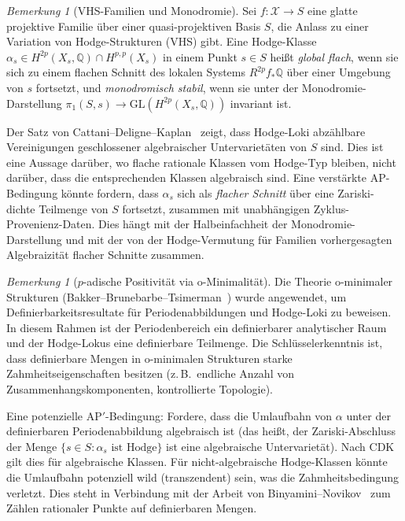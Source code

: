 \documentclass[aps,prd,twocolumn,superscriptaddress,nofootinbib]{revtex4-2}
\theoremstyle{definition}
\theoremstyle{remark}
\newtheorem{remark}[theorem]{Bemerkung}
\begin{document}
\begin{remark}[VHS-Familien und Monodromie]
\label{rem:vhs-monodromy}
Sei $f: \mathcal{X} \to S$ eine glatte projektive Familie über einer quasi-projektiven Basis $S$, die Anlass zu einer Variation von Hodge-Strukturen (VHS) gibt. Eine Hodge-Klasse $\alpha_s \in H^{2p}(X_s, \mathbb{Q}) \cap H^{p,p}(X_s)$ in einem Punkt $s \in S$ heißt \textit{global flach}, wenn sie sich zu einem flachen Schnitt des lokalen Systems $R^{2p}f_*\mathbb{Q}$ über einer Umgebung von $s$ fortsetzt, und \textit{monodromisch stabil}, wenn sie unter der Monodromie-Darstellung $\pi_1(S, s) \to \mathrm{GL}(H^{2p}(X_s, \mathbb{Q}))$ invariant ist.

Der Satz von Cattani--Deligne--Kaplan~\cite{CattaniDeligneKaplan1995} zeigt, dass Hodge-Loki abzählbare Vereinigungen geschlossener algebraischer Untervarietäten von $S$ sind. Dies ist eine Aussage darüber, wo flache rationale Klassen vom Hodge-Typ bleiben, nicht darüber, dass die entsprechenden Klassen algebraisch sind. Eine verstärkte AP-Bedingung könnte fordern, dass $\alpha_s$ sich als \textit{flacher Schnitt} über eine Zariski-dichte Teilmenge von $S$ fortsetzt, zusammen mit unabhängigen Zyklus-Provenienz-Daten. Dies hängt mit der Halbeinfachheit der Monodromie-Darstellung und mit der von der Hodge-Vermutung für Familien vorhergesagten Algebraizität flacher Schnitte zusammen.
\end{remark}

\begin{remark}[$p$-adische Positivität via o-Minimalität]
\label{rem:o-minimality}
Die Theorie o-minimaler Strukturen (Bakker--Brunebarbe--Tsimerman~\cite{BBT2023}) wurde angewendet, um Definierbarkeitsresultate für Periodenabbildungen und Hodge-Loki zu beweisen. In diesem Rahmen ist der Periodenbereich ein definierbarer analytischer Raum und der Hodge-Lokus eine definierbare Teilmenge. Die Schlüsselerkenntnis ist, dass definierbare Mengen in o-minimalen Strukturen starke Zahmheitseigenschaften besitzen (z.\,B.\ endliche Anzahl von Zusammenhangskomponenten, kontrollierte Topologie).

Eine potenzielle AP$'$-Bedingung: Fordere, dass die \glqq Umlaufbahn\grqq{} von $\alpha$ unter der definierbaren Periodenabbildung algebraisch ist (das heißt, der Zariski-Abschluss der Menge $\{s \in S : \alpha_s \text{ ist Hodge}\}$ ist eine algebraische Untervarietät). Nach CDK gilt dies für algebraische Klassen. Für nicht-algebraische Hodge-Klassen könnte die Umlaufbahn potenziell \glqq wild\grqq{} (transzendent) sein, was die Zahmheitsbedingung verletzt. Dies steht in Verbindung mit der Arbeit von Binyamini--Novikov~\cite{BinyaminiNovikov2017} zum Zählen rationaler Punkte auf definierbaren Mengen.
\end{remark}
\end{document}

